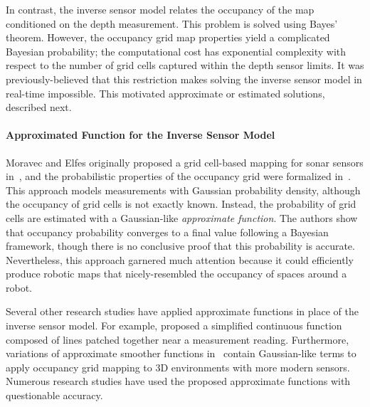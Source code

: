\documentclass[thesis]{thesis-gwu}
\begin{document}
In contrast, the inverse sensor model relates the occupancy of the map conditioned on the depth measurement. This problem is solved using Bayes' theorem. However, the occupancy grid map properties yield a complicated Bayesian probability; the computational cost has exponential complexity with respect to the number of grid cells captured within the depth sensor limits. It was previously-believed that this restriction makes solving the inverse sensor model in real-time impossible. This motivated approximate or estimated solutions, described next.

\paragraph{Approximated Function for the Inverse Sensor Model} Moravec and Elfes originally proposed a grid cell-based mapping for sonar sensors in~\cite{MorElf85}, and the probabilistic properties of the occupancy grid were formalized in~\cite{MorElf85,Elf89}. This approach models measurements with Gaussian probability density, although the occupancy of grid cells is not exactly known. Instead, the probability of grid cells are estimated with a Gaussian-like \emph{approximate function}. The authors show that occupancy probability converges to a final value following a Bayesian framework, though there is no conclusive proof that this probability is accurate. Nevertheless, this approach garnered much attention because it could efficiently produce robotic maps that nicely-resembled the occupancy of spaces around a robot.

Several other research studies have applied approximate functions in place of the inverse sensor model. For example, \cite{ChoLynHutKanBurKavThr05} proposed a simplified continuous function composed of lines patched together near a measurement reading. Furthermore, variations of approximate smoother functions in~\cite{and09,PirRutBisSch11,KhoElb12} contain Gaussian-like terms to apply occupancy grid mapping to 3D environments with more modern sensors. Numerous research studies have used the proposed approximate functions with questionable accuracy.
\end{document}
